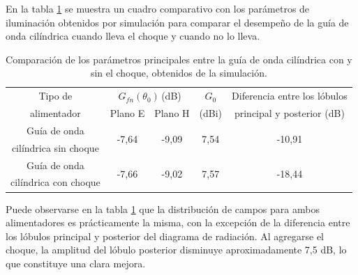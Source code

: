 En la tabla \ref{tabla_estudio:15} se muestra un cuadro comparativo con los parámetros de iluminación obtenidos por simulación para comparar el desempeño de la guía de onda cilíndrica cuando lleva el choque y cuando no lo lleva.
\begin{table}[H]
\centering
\begin{tabular}{|c|c|c|c|c|}
\hline
Tipo de & \multicolumn{2}{c|}{$G_{fn}\left(\theta_0\right)\,$(dB)} & $G_0$ & Diferencia entre los lóbulos\\
\cline{2-3}
alimentador & Plano E & Plano H & (dBi) & principal y posterior (dB) \\
\hline
Guía de onda & \multirow{2}{*}{-7,64} & \multirow{2}{*}{-9,09} & \multirow{2}{*}{7,54} & \multirow{2}{*}{-10,91} \\
cilíndrica sin choque & & & & \\
\hline
Guía de onda & \multirow{2}{*}{-7,66} & \multirow{2}{*}{-9,02} & \multirow{2}{*}{7,57} & \multirow{2}{*}{-18,44} \\
cilíndrica con choque & & & & \\
\hline
\end{tabular}
\caption{Comparación de los parámetros principales entre la guía de onda cilíndrica con y sin el choque, obtenidos de la simulación.}
\label{tabla_estudio:15}
\end{table}
Puede observarse en la tabla \ref{tabla_estudio:15} que la distribución de campos para ambos alimentadores es prácticamente la misma, con la excepción de la diferencia entre los lóbulos principal y posterior del diagrama de radiación. Al agregarse el choque, la amplitud del lóbulo posterior disminuye aproximadamente 7,5 dB, lo que constituye una clara mejora.

